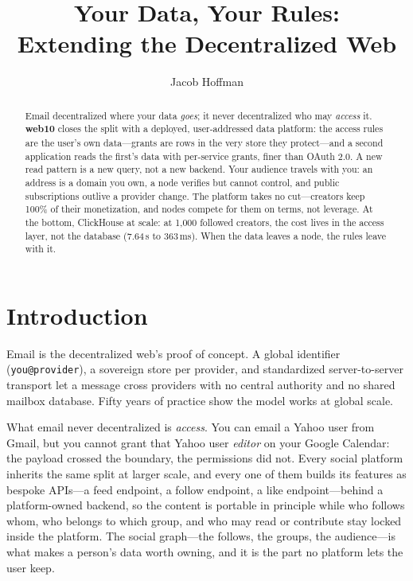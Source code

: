 \documentclass[sigconf, nonacm]{acmart}
\title{Your Data, Your Rules: \\ Extending the Decentralized Web}
\author{Jacob Hoffman}
\affiliation{\institution{web10 Inc.}\country{}}
\begin{document}
\begin{abstract}
Email decentralized where your data \emph{goes}; it never decentralized who
may \emph{access} it. \textbf{web10} closes the split with a deployed,
user-addressed data platform: the access rules are the user's own
data---grants are rows in the very store they protect---and a second
application reads the first's data with per-service grants, finer than OAuth
2.0. A new read pattern is a new query, not a new backend. Your audience
travels with you: an address is a domain you own, a node verifies but cannot
control, and public subscriptions outlive a provider change. The platform
takes no cut---creators keep 100\% of their monetization, and nodes compete
for them on terms, not leverage. At the bottom, ClickHouse at scale: at
1,000 followed creators, the cost lives in the access layer, not the
database (7.64\,s to 363\,ms). When the data leaves a node, the rules leave
with it.
\end{abstract}

\maketitle
\section{Introduction}
\label{sec:intro}

Email is the decentralized web's proof of concept. A global identifier
(\texttt{you@provider}), a sovereign store per provider, and standardized
server-to-server transport let a message cross providers with no central
authority and no shared mailbox database. Fifty years of practice show the
model works at global scale.

What email never decentralized is \emph{access}. You can email a Yahoo user
from Gmail, but you cannot grant that Yahoo user \emph{editor} on your Google
Calendar: the payload crossed the boundary, the permissions did not. Every
social platform inherits the same split at larger scale, and every one of
them builds its features as bespoke APIs---a feed endpoint, a follow
endpoint, a like endpoint---behind a platform-owned backend, so the content
is portable in principle while who follows whom, who belongs to which group,
and who may read or contribute stay locked inside the platform. The social
graph---the follows, the groups, the audience---is what makes a person's
data worth owning, and it is the part no platform lets the user keep.
\end{document}
